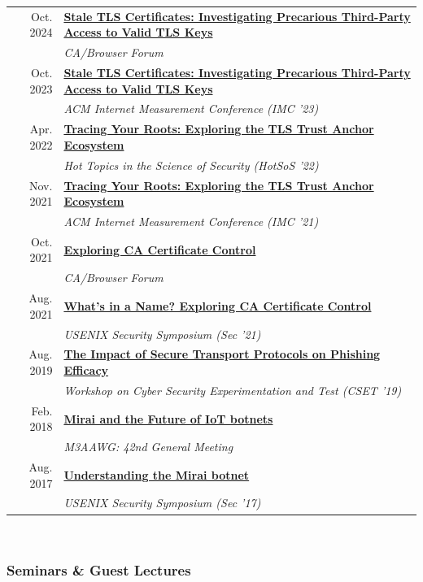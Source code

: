 \documentclass[10pt,singlecolumn]{article} %
\begin{document}
\begin{tabular}{rl}
Oct. 2024 & \textbf{\href{https://zanema.com/slides/cab_forum_stale_certs.pdf}{Stale TLS Certificates: Investigating Precarious Third-Party Access to Valid TLS Keys}}\\
& \emph{CA/Browser Forum} \\
Oct. 2023 & \textbf{\href{https://zanema.com/slides/imc23_stale_certs.pdf}{Stale TLS Certificates: Investigating Precarious Third-Party Access to Valid TLS Keys}}\\
& \emph{ACM Internet Measurement Conference (IMC '23)} \\
Apr. 2022 & \textbf{\href{https://cps-vo.org/node/82522}{Tracing Your Roots: Exploring the TLS Trust Anchor Ecosystem}}\\
& \emph{Hot Topics in the Science of Security (HotSoS '22)}\\
Nov. 2021 & \textbf{\href{https://zanema.com/videos/imc21-roots.mp4}{Tracing Your Roots: Exploring the TLS Trust Anchor Ecosystem}}\\
& \emph{ACM Internet Measurement Conference (IMC '21)} \\
Oct. 2021 & \textbf{\href{https://zanema.com/slides/cab_forum_ca_transparency.pdf}{Exploring CA Certificate Control}}\\
& \emph{CA/Browser Forum} \\
Aug. 2021 & \textbf{\href{https://www.youtube.com/watch?v=Aq1o8prmoyE}{What's in a Name? Exploring CA Certificate Control}} \\
& \emph{USENIX Security Symposium (Sec '21)} \\
Aug. 2019 & \textbf{\href{https://zanema.com/slides/cset-https-phishing-2019.pdf}{The Impact of Secure Transport Protocols on Phishing Efficacy}} \\
& \emph{Workshop on Cyber Security Experimentation and Test (CSET '19)} \\
Feb. 2018 & \textbf{\href{https://zanema.com/slides/m3aawg_mirai.pdf}{Mirai and the Future of IoT botnets}}\\
& \emph{M3AAWG: 42nd General Meeting} \\ 
Aug. 2017 & \textbf{\href{https://www.youtube.com/watch?v=1pywzRTJDaY}{Understanding the Mirai botnet}} \\
& \emph{USENIX Security Symposium (Sec '17)} \\ 
\end{tabular} \\


\subsubsection*{Seminars \& Guest Lectures}
\end{document}
